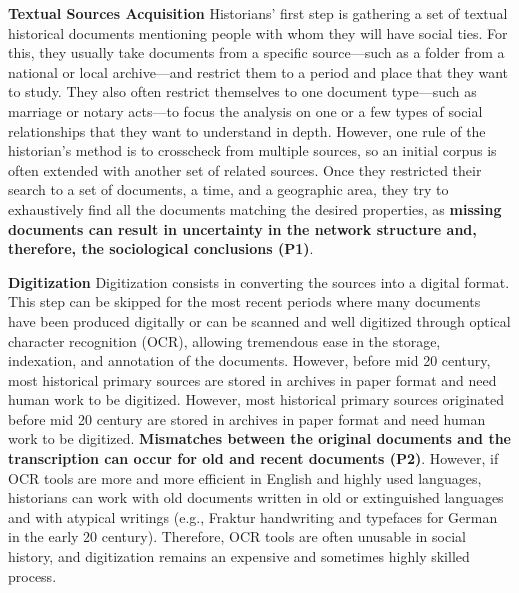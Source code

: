 \noindent\textbf{Textual Sources Acquisition}
Historians' first step is gathering a set of textual historical documents mentioning people with whom they will have social ties.
For this, they usually take documents from a specific source---such as a folder from a national or local archive---and restrict them to a period and place that they want to study.
They also often restrict themselves to one document type---such as marriage or notary acts---to focus the analysis on one or a few types of social relationships that they want to understand in depth.
However, one rule of the historian's method is to crosscheck from multiple sources, so an initial corpus is often extended with another set of related sources.
Once they restricted their search to a set of documents, a time, and a geographic area, they try to exhaustively find all the documents matching the desired properties, as \textbf{missing documents can result in uncertainty in the network structure and, therefore, the sociological conclusions (P1)}.

\noindent\textbf{Digitization}
Digitization consists in converting the sources into a digital format.
This step can be skipped for the most recent periods where many documents have been produced digitally or can be scanned and well digitized through optical character recognition (OCR), allowing tremendous ease in the storage, indexation, and annotation of the documents.
However, before mid 20 century, most historical primary sources are stored in archives in paper format and need human work to be digitized.
However, most historical primary sources originated before mid 20 century are stored in archives in paper format and need human work to be digitized.
\textbf{Mismatches between the original documents and the transcription can occur for old and recent documents (P2)}.
However, if OCR tools are more and more efficient in English and highly used languages, historians can work with old documents written in old or extinguished languages and with atypical writings (e.g., Fraktur handwriting and typefaces for German in the early 20 century).
Therefore, OCR tools are often unusable in social history, and digitization remains an expensive and sometimes highly skilled process.

